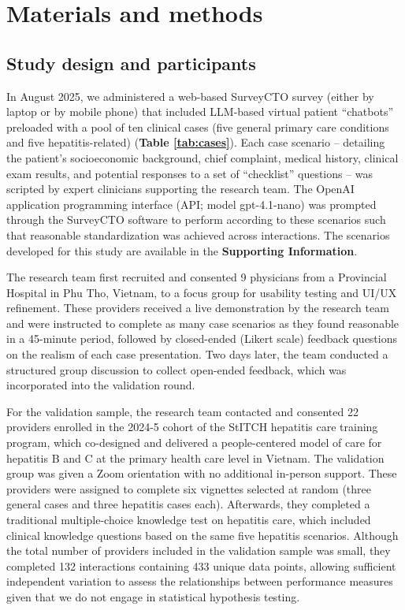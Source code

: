\documentclass{article}
\begin{document}

\section{Materials and methods}

\subsection{Study design and participants}

In August 2025, we administered a web-based SurveyCTO survey (either by laptop or by mobile phone) that included LLM-based virtual patient ``chatbots'' preloaded with a pool of ten clinical cases (five general primary care conditions and five hepatitis-related) (\textbf{Table \ref{tab:cases}}). Each case scenario -- detailing the patient's socioeconomic background, chief complaint, medical history, clinical exam results, and potential responses to a set of ``checklist'' questions -- was scripted by expert clinicians supporting the research team. The OpenAI application programming interface (API; model gpt-4.1-nano) was prompted through the SurveyCTO software to perform according to these scenarios such that reasonable standardization was achieved across interactions. The scenarios developed for this study are available in the \textbf{Supporting Information}.

The research team first recruited and consented 9 physicians from a Provincial Hospital in Phu Tho, Vietnam, to a focus group for usability testing and UI/UX refinement. These providers received a live demonstration by the research team and were instructed to complete as many case scenarios as they found reasonable in a 45-minute period, followed by closed-ended (Likert scale) feedback questions on the realism of each case presentation. Two days later, the team conducted a structured group discussion to collect open-ended feedback, which was incorporated into the validation round.

For the validation sample, the research team contacted and consented 22 providers enrolled in the 2024-5 cohort of the StITCH hepatitis care training program, which co-designed and delivered a people-centered model of care for hepatitis B and C at the primary health care level in Vietnam. The validation group was given a Zoom orientation with no additional in-person support. These providers were assigned to complete six vignettes selected at random (three general cases and three hepatitis cases each). Afterwards, they completed a traditional multiple-choice knowledge test on hepatitis care, which included clinical knowledge questions based on the same five hepatitis scenarios. Although the total number of providers included in the validation sample was small, they completed 132 interactions containing 433 unique data points, allowing sufficient independent variation to assess the relationships between performance measures given that we do not engage in statistical hypothesis testing.
\end{document}
